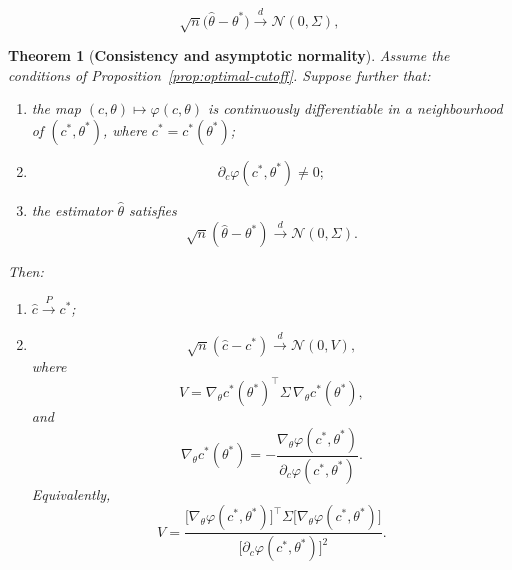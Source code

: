 \documentclass[10pt,a4paper]{amsart}
\newtheorem{theorem}{Theorem}
\begin{document}
\begin{equation}
\label{eq:theta-an}
\sqrt{n}\bigl(\hat\theta-\theta^*\bigr)
\stackrel{d}{\longrightarrow}
\mathcal N(0,\Sigma),
\end{equation}

\begin{theorem}[\textbf{Consistency and asymptotic normality}]
\label{thm:asymptotics}
Assume the conditions of Proposition~\ref{prop:optimal-cutoff}. Suppose further that:
\begin{enumerate}
\item the map $(c,\theta)\mapsto\varphi(c,\theta)$ is continuously differentiable in a neighbourhood of $(c^*,\theta^*)$, where $c^*=c^*(\theta^*)$;
\item
\[
\partial_c\varphi(c^*,\theta^*)\neq 0;
\]
\item the estimator $\hat\theta$ satisfies
\[
\sqrt{n}(\hat\theta-\theta^*)\stackrel{d}{\longrightarrow}\mathcal N(0,\Sigma).
\]
\end{enumerate}
Then:
\begin{enumerate}
\item $\hat c\xrightarrow{P}c^*$;
\item
\[
\sqrt{n}(\hat c-c^*)\stackrel{d}{\longrightarrow}\mathcal N(0,V),
\]
where
\begin{equation}
\label{eq:V-general}
V
=
\nabla_\theta c^*(\theta^*)^\top\Sigma\,\nabla_\theta c^*(\theta^*),
\end{equation}
and
\begin{equation}
\label{eq:gradient-cstar}
\nabla_\theta c^*(\theta^*)
= - \frac{\nabla_\theta\varphi(c^*,\theta^*)}{\partial_c\varphi(c^*,\theta^*)}.
\end{equation}
Equivalently,
\begin{equation}
\label{eq:variance}
V
=
\frac{
\bigl[\nabla_\theta\varphi(c^*,\theta^*)\bigr]^\top
\Sigma
\bigl[\nabla_\theta\varphi(c^*,\theta^*)\bigr]
}{
\bigl[\partial_c\varphi(c^*,\theta^*)\bigr]^2
}.
\end{equation}
\end{enumerate}
\end{theorem}
\end{document}

